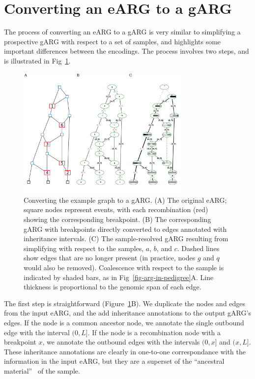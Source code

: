 \documentclass{article}
\begin{document}
\section*{Converting an eARG to a gARG}
The process of converting an eARG to a gARG is very similar to
simplifying a prospective gARG with respect to a set of samples,
and highlights some important differences between the encodings.
The process involves two steps, and is illustrated in
Fig~\ref{fig-ancestry-resolution}.

\begin{figure}
\centering
\includegraphics[width=0.75\textwidth]{illustrations/ancestry-resolution}
\caption{\label{fig-ancestry-resolution}
Converting the \citet[][Fig.~1]{wiuf1999recombination} example graph
to a gARG. (A) The original eARG; square nodes represent events, with
each recombination (red) showing the corresponding breakpoint.
(B) The corresponding gARG with breakpoints directly converted to
edges annotated with inheritance intervals.
(C) The sample-resolved gARG resulting from simplifying with respect
to the samples, $a$, $b$, and $c$. Dashed lines show edges that are
no longer present (in practice, nodes $g$ and $q$ would also be removed).
Coalescence with respect to the sample is indicated by shaded bars, as
in Fig~\ref{fig-arg-in-pedigree}A.
Line thickness is proportional to the genomic span of each edge.
}
\end{figure}

The first step is straightforward
(Figure~\ref{fig-ancestry-resolution}B).
We duplicate the nodes and
edges from the input eARG, and the add inheritance annotations
to the output gARG's edges. If the node is a common ancestor node,
we annotate the single outbound edge with the interval $(0,L]$.
If the node is a recombination node with a breakpoint $x$,
we annotate the outbound edges with the intervals $(0, x]$
and $(x, L]$.
These inheritance annotations are clearly in one-to-one
correspondance with the information in the input eARG,
but they are a superset of the
``ancestral material''~\citep{wiuf1999ancestry,wiuf1999recombination}
of the sample.
\end{document}
